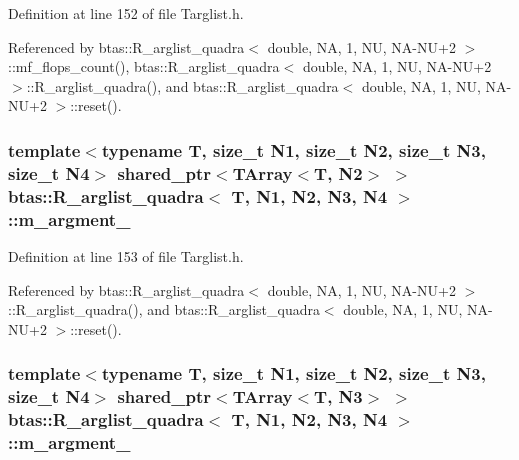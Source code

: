 Definition at line 152 of file Targlist.\-h.



Referenced by btas\-::\-R\-\_\-arglist\-\_\-quadra$<$ double, N\-A, 1, N\-U, N\-A-\/\-N\-U+2 $>$\-::mf\-\_\-flops\-\_\-count(), btas\-::\-R\-\_\-arglist\-\_\-quadra$<$ double, N\-A, 1, N\-U, N\-A-\/\-N\-U+2 $>$\-::\-R\-\_\-arglist\-\_\-quadra(), and btas\-::\-R\-\_\-arglist\-\_\-quadra$<$ double, N\-A, 1, N\-U, N\-A-\/\-N\-U+2 $>$\-::reset().

\subsubsection[{m\-\_\-argment\-\_\-2}]{\setlength{\rightskip}{0pt plus 5cm}template$<$typename T, size\-\_\-t N1, size\-\_\-t N2, size\-\_\-t N3, size\-\_\-t N4$>$ shared\-\_\-ptr$<${\bf T\-Array}$<$T, N2$>$ $>$ {\bf btas\-::\-R\-\_\-arglist\-\_\-quadra}$<$ T, N1, N2, N3, N4 $>$\-::m\-\_\-argment\-\_\hspace{0.3cm}{\ttfamily [protected]}}\label{d4/dec/classbtas_1_1R__arglist__quadra_aad9f4f0845bcf94d6d51da9dd50a3e0d}


Definition at line 153 of file Targlist.\-h.



Referenced by btas\-::\-R\-\_\-arglist\-\_\-quadra$<$ double, N\-A, 1, N\-U, N\-A-\/\-N\-U+2 $>$\-::\-R\-\_\-arglist\-\_\-quadra(), and btas\-::\-R\-\_\-arglist\-\_\-quadra$<$ double, N\-A, 1, N\-U, N\-A-\/\-N\-U+2 $>$\-::reset().

\subsubsection[{m\-\_\-argment\-\_\-3}]{\setlength{\rightskip}{0pt plus 5cm}template$<$typename T, size\-\_\-t N1, size\-\_\-t N2, size\-\_\-t N3, size\-\_\-t N4$>$ shared\-\_\-ptr$<${\bf T\-Array}$<$T, N3$>$ $>$ {\bf btas\-::\-R\-\_\-arglist\-\_\-quadra}$<$ T, N1, N2, N3, N4 $>$\-::m\-\_\-argment\-\_\hspace{0.3cm}{\ttfamily [protected]}}\label{d4/dec/classbtas_1_1R__arglist__quadra_a63d0876f1f74b494690fd19d578bc95b}


